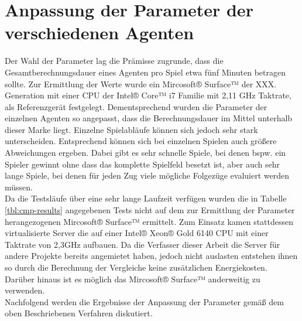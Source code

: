 \section{Anpassung der Parameter der verschiedenen Agenten}
Der Wahl der Parameter lag die Prämisse zugrunde, dass die Gesamtberechnungsdauer eines Agenten pro Spiel etwa fünf Minuten betragen sollte. Zur Ermittlung der Werte wurde ein  Mircosoft® Surface™ der XXX. Generation mit einer CPU der Intel® Core™ i7 Familie mit 2,11 GHz Taktrate, als Referenzgerät festgelegt. Dementsprechend wurden die Parameter der einzelnen Agenten so angepasst, dass die Berechnungsdauer im Mittel unterhalb dieser Marke liegt. Einzelne Spielabläufe können sich jedoch sehr stark unterscheiden. Entsprechend können sich bei einzelnen Spielen auch größere Abweichungen ergeben. Dabei gibt es sehr schnelle Spiele, bei denen bspw. ein Spieler gewinnt ohne dass das komplette Spielfeld besetzt ist, aber auch sehr lange Spiele, bei denen für jeden Zug viele mögliche Folgezüge evaluiert werden müssen.
\\Da die Testsläufe über eine sehr lange Laufzeit verfügen wurden die in Tabelle \ref{tbl:cmp-results} angegebenen Tests nicht auf dem zur Ermittlung der Parameter herangezogenen Mircosoft® Surface™ ermittelt. Zum Einsatz kamen stattdessen virtualisierte Server die auf einer Intel® Xeon® Gold 6140 CPU mit einer Taktrate von 2,3GHz aufbauen. Da die Verfasser dieser Arbeit die Server für andere Projekte bereits angemietet haben, jedoch nicht auslasten entstehen ihnen so durch die Berechnung der Vergleiche keine zusätzlichen Energiekosten. Darüber hinaus ist es möglich das Mircosoft® Surface™ anderweitig zu verwenden.
\\Nachfolgend werden die Ergebnisse der Anpassung der Parameter gemäß dem oben Beschriebenen Verfahren diskutiert.
